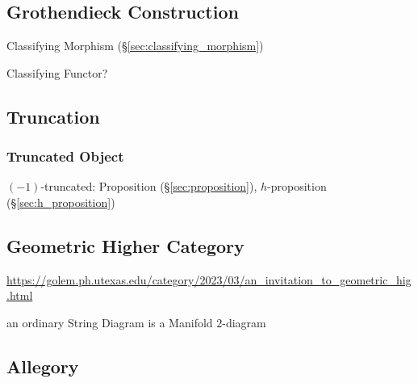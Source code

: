 \subsection{Grothendieck Construction}
\label{sec:grothendieck_construction}

Classifying Morphism (\S\ref{sec:classifying_morphism})

Classifying Functor?



\subsection{Truncation}\label{sec:truncation}

\subsubsection{Truncated Object}\label{sec:truncated_object}

$(-1)$-truncated: Proposition (\S\ref{sec:proposition}),
$h$-proposition (\S\ref{sec:h_proposition})



\subsection{Geometric Higher Category}\label{sec:geometric_higher_category}

\url{https://golem.ph.utexas.edu/category/2023/03/an_invitation_to_geometric_hig.html}

an ordinary String Diagram is a Manifold $2$-diagram



\subsection{Allegory}\label{sec:allegory}


